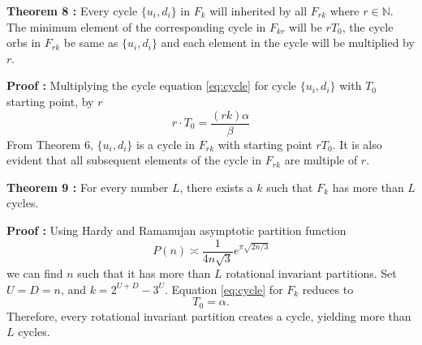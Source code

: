 \documentclass[12pt]{article} %
\begin{document}
\textbf{Theorem 8 :}
Every cycle $\{u_i, d_i\}$ in $F_k$ will inherited by all $F_{rk}$ where $r \in \mathbb{N}$. The minimum element of the corresponding cycle in $F_{kr}$ will be $rT_0$, the cycle orbs in $F_{rk}$ be same as $\{u_i, d_i\}$ and each element in the cycle will be multiplied by $r$.

\textbf{Proof :}
Multiplying the cycle equation \eqref{eq:cycle} for cycle $\{u_i, d_i\}$ with $T_0$ starting point, by $r$
\[
r \cdot T_0 = \frac{(r k) \alpha}{\beta}
\]
From Theorem 6, $\{u_i, d_i\}$ is a cycle in $F_{rk}$ with starting point $r T_0$. It is also evident that all subsequent elements of the cycle in $F_{rk}$ are multiple of $r$.\\
\newline

\textbf{Theorem 9 :}
 For every number $L$, there exists a $k$ such that $F_k$ has more than $L$ cycles.
 
 \textbf{Proof :}
 Using Hardy and Ramanujan asymptotic partition function
 \[
 P(n) \asymp \frac{1}{4 n \sqrt{3}} e^{\pi \sqrt{2n/3}}
 \]
 we can find $n$ such that it has more than $L$ rotational invariant partitions. Set $U = D = n$,  and $k = 2^{U+D} - 3^U$. Equation \ref{eq:cycle} for $F_k$ reduces to 
\[T_0 = \alpha.\]
Therefore, every rotational invariant partition creates a cycle, yielding more than $L$ cycles.
\newline
\end{document}
